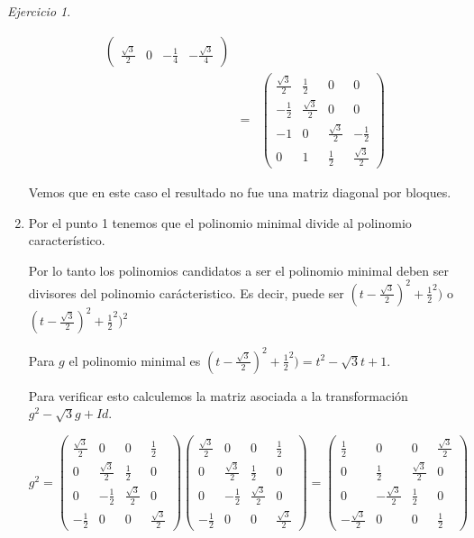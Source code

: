 \documentclass[11pt,a4paper]{article}
\theoremstyle{definition}
\theoremstyle{remark}
\newtheorem{exc}{Ejercicio}
\begin{document}
\begin{exc}
\begin{enumerate}
\begin{eqnarray}
\begin{pmatrix}
			\\ \frac{\sqrt{3}}{2} & 0 & -\frac{1}{4} & -\frac{\sqrt{3}}{4}
			\end{pmatrix} \nonumber 
			\\ & = &
			\begin{pmatrix}
			\frac{\sqrt{3}}{2} & \frac{1}{2} & 0 & 0
			\\ -\frac{1}{2} & \frac{\sqrt{3}}{2} & 0 & 0
			\\ -1 & 0 & \frac{\sqrt{3}}{2} & -\frac{1}{2}  
			\\ 0 & 1 & \frac{1}{2} & \frac{\sqrt{3}}{2}
			\end{pmatrix} \nonumber 
			\end{eqnarray}
			
			Vemos que en este caso el resultado no fue una matriz diagonal por bloques.
			
			\item Por el punto 1 tenemos que el polinomio minimal divide al polinomio característico.
			
			Por lo tanto los polinomios candidatos a ser el polinomio minimal deben ser divisores del polinomio carácteristico. Es decir, puede ser $ (t-\frac{\sqrt{3}}{2})^2+\frac{1}{2}^2) $ o $ (t-\frac{\sqrt{3}}{2})^2+\frac{1}{2}^2)^2 $ 
			
			Para $ g $ el polinomio minimal es $ (t-\frac{\sqrt{3}}{2})^2+\frac{1}{2}^2) = t^2 -\sqrt{3}t+1$.
			
			Para verificar esto calculemos la matriz asociada a la transformación $ g^2-\sqrt{3}g+Id $.
			
			\begin{equation}
			g^2 = \begin{pmatrix}
			\frac{\sqrt{3}}{2} & 0 & 0 & \frac{1}{2}
			\\ 0 & \frac{\sqrt{3}}{2} & \frac{1}{2} & 0 
			\\ 0 & -\frac{1}{2} & \frac{\sqrt{3}}{2} & 0
			\\ -\frac{1}{2} & 0 & 0 & \frac{\sqrt{3}}{2}
			\end{pmatrix}
			\begin{pmatrix}
			\frac{\sqrt{3}}{2} & 0 & 0 & \frac{1}{2}
			\\ 0 & \frac{\sqrt{3}}{2} & \frac{1}{2} & 0 
			\\ 0 & -\frac{1}{2} & \frac{\sqrt{3}}{2} & 0
			\\ -\frac{1}{2} & 0 & 0 & \frac{\sqrt{3}}{2}
			\end{pmatrix}\nonumber =
			\begin{pmatrix}
			\frac{1}{2} & 0 & 0 & \frac{\sqrt{3}}{2}
			\\ 0 & \frac{1}{2} & \frac{\sqrt{3}}{2} & 0 
			\\ 0 & -\frac{\sqrt{3}}{2} & \frac{1}{2} & 0
			\\ -\frac{\sqrt{3}}{2} & 0 & 0 & \frac{1}{2}
			\end{pmatrix}
			\end{equation}
			

\end{enumerate}
\end{exc}
\end{document}
